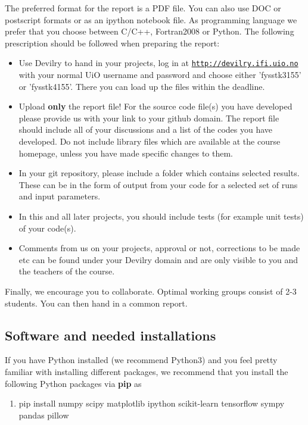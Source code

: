 \documentclass[%
oneside,                 %
final,                   %
10pt]{article}
\begin{document}
The preferred format for the report is a PDF file. You can also use DOC or postscript formats or as an ipython notebook file.  As programming language we prefer that you choose between C/C++, Fortran2008 or Python. The following prescription should be followed when preparing the report:

\begin{itemize}
  \item Use Devilry to hand in your projects, log in  at  \href{{http://devilry.ifi.uio.no}}{\nolinkurl{http://devilry.ifi.uio.no}} with your normal UiO username and password and choose either 'fysstk3155' or 'fysstk4155'. There you can load up the files within the deadline.

  \item Upload \textbf{only} the report file!  For the source code file(s) you have developed please provide us with your link to your github domain.  The report file should include all of your discussions and a list of the codes you have developed.  Do not include library files which are available at the course homepage, unless you have made specific changes to them.

  \item In your git repository, please include a folder which contains selected results. These can be in the form of output from your code for a selected set of runs and input parameters.

  \item In this and all later projects, you should include tests (for example unit tests) of your code(s).

  \item Comments  from us on your projects, approval or not, corrections to be made  etc can be found under your Devilry domain and are only visible to you and the teachers of the course.
\end{itemize}

\noindent
Finally, 
we encourage you to collaborate. Optimal working groups consist of 
2-3 students. You can then hand in a common report. 



\subsection*{Software and needed installations}

If you have Python installed (we recommend Python3) and you feel pretty familiar with installing different packages, 
we recommend that you install the following Python packages via \textbf{pip} as
\begin{enumerate}
\item pip install numpy scipy matplotlib ipython scikit-learn tensorflow sympy pandas pillow
\end{enumerate}
\end{document}
